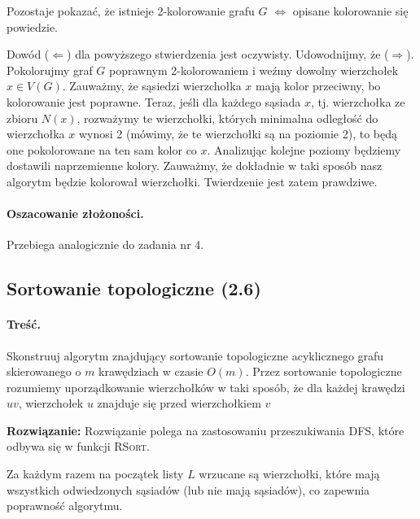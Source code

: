 Pozostaje pokazać, że istnieje 2-kolorowanie grafu $G$ $\Leftrightarrow$ opisane kolorowanie się powiedzie. 

Dowód ($\Leftarrow$) dla powyższego stwierdzenia jest oczywisty. Udowodnijmy, że ($\Rightarrow$). Pokolorujmy graf $G$
poprawnym 2-kolorowaniem i weźmy dowolny wierzchołek $x \in V(G)$. Zauważmy, że sąsiedzi
wierzchołka $x$ mają kolor przeciwny, bo kolorowanie jest poprawne. Teraz, jeśli dla każdego
sąsiada $x$, tj. wierzchołka ze zbioru $N(x)$, rozważymy te wierzchołki, których minimalna odległość do wierzchołka 
$x$ wynosi 2 (mówimy, że te wierzchołki są na poziomie 2), to będą one pokolorowane na ten sam 
kolor co $x$. Analizując kolejne poziomy
będziemy dostawili naprzemienne kolory. Zauważmy, że dokładnie w taki sposób nasz algorytm
będzie kolorował wierzchołki. Twierdzenie jest zatem prawdziwe.

\paragraph{Oszacowanie złożoności.} Przebiega analogicznie do zadania nr 4.

\subsection{Sortowanie topologiczne (2.6)}
\label{zad:tsort}
\paragraph{Treść.} Skonstruuj algorytm znajdujący 
sortowanie topologiczne acyklicznego grafu skierowanego 
o $m$ krawędziach w czasie $O(m)$. 
Przez sortowanie topologiczne rozumiemy uporządkowanie 
wierzchołków w taki sposób, że dla
każdej krawędzi $uv$, wierzchołek $u$ znajduje się przed 
wierzchołkiem $v$

\textbf{Rozwiązanie:} Rozwiązanie polega na zastosowaniu przeszukiwania DFS, które
odbywa się w funkcji \textsc{RSort}.

Za każdym razem na początek listy $L$ wrzucane są wierzchołki, 
które mają wszystkich odwiedzonych sąsiadów (lub nie mają sąsiadów),
co zapewnia poprawność algorytmu.

